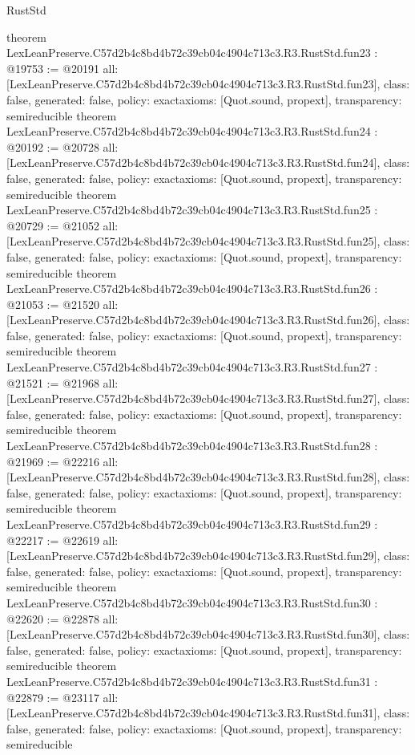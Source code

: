 \begin{lexlean}{RustStd}
\begin{coremodule}
{}
theorem LexLeanPreserve.C57d2b4c8bd4b72c39cb04c4904c713c3.R3.RustStd.fun23 : @19753 := @20191 {
  all: [LexLeanPreserve.C57d2b4c8bd4b72c39cb04c4904c713c3.R3.RustStd.fun23],
  class: false,
  generated: false,
  policy: exact{axioms: [Quot.sound, propext]},
  transparency: semireducible
}
theorem LexLeanPreserve.C57d2b4c8bd4b72c39cb04c4904c713c3.R3.RustStd.fun24 : @20192 := @20728 {
  all: [LexLeanPreserve.C57d2b4c8bd4b72c39cb04c4904c713c3.R3.RustStd.fun24],
  class: false,
  generated: false,
  policy: exact{axioms: [Quot.sound, propext]},
  transparency: semireducible
}
theorem LexLeanPreserve.C57d2b4c8bd4b72c39cb04c4904c713c3.R3.RustStd.fun25 : @20729 := @21052 {
  all: [LexLeanPreserve.C57d2b4c8bd4b72c39cb04c4904c713c3.R3.RustStd.fun25],
  class: false,
  generated: false,
  policy: exact{axioms: [Quot.sound, propext]},
  transparency: semireducible
}
theorem LexLeanPreserve.C57d2b4c8bd4b72c39cb04c4904c713c3.R3.RustStd.fun26 : @21053 := @21520 {
  all: [LexLeanPreserve.C57d2b4c8bd4b72c39cb04c4904c713c3.R3.RustStd.fun26],
  class: false,
  generated: false,
  policy: exact{axioms: [Quot.sound, propext]},
  transparency: semireducible
}
theorem LexLeanPreserve.C57d2b4c8bd4b72c39cb04c4904c713c3.R3.RustStd.fun27 : @21521 := @21968 {
  all: [LexLeanPreserve.C57d2b4c8bd4b72c39cb04c4904c713c3.R3.RustStd.fun27],
  class: false,
  generated: false,
  policy: exact{axioms: [Quot.sound, propext]},
  transparency: semireducible
}
theorem LexLeanPreserve.C57d2b4c8bd4b72c39cb04c4904c713c3.R3.RustStd.fun28 : @21969 := @22216 {
  all: [LexLeanPreserve.C57d2b4c8bd4b72c39cb04c4904c713c3.R3.RustStd.fun28],
  class: false,
  generated: false,
  policy: exact{axioms: [Quot.sound, propext]},
  transparency: semireducible
}
theorem LexLeanPreserve.C57d2b4c8bd4b72c39cb04c4904c713c3.R3.RustStd.fun29 : @22217 := @22619 {
  all: [LexLeanPreserve.C57d2b4c8bd4b72c39cb04c4904c713c3.R3.RustStd.fun29],
  class: false,
  generated: false,
  policy: exact{axioms: [Quot.sound, propext]},
  transparency: semireducible
}
theorem LexLeanPreserve.C57d2b4c8bd4b72c39cb04c4904c713c3.R3.RustStd.fun30 : @22620 := @22878 {
  all: [LexLeanPreserve.C57d2b4c8bd4b72c39cb04c4904c713c3.R3.RustStd.fun30],
  class: false,
  generated: false,
  policy: exact{axioms: [Quot.sound, propext]},
  transparency: semireducible
}
theorem LexLeanPreserve.C57d2b4c8bd4b72c39cb04c4904c713c3.R3.RustStd.fun31 : @22879 := @23117 {
  all: [LexLeanPreserve.C57d2b4c8bd4b72c39cb04c4904c713c3.R3.RustStd.fun31],
  class: false,
  generated: false,
  policy: exact{axioms: [Quot.sound, propext]},
  transparency: semireducible
}
\end{coremodule}
\end{lexlean}
